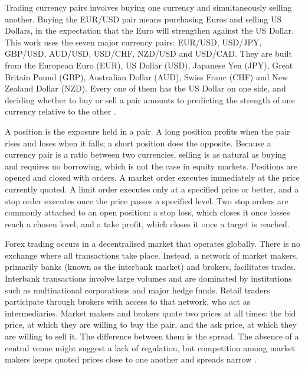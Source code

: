 Trading currency pairs involves buying one currency and simultaneously selling another. Buying the EUR/USD pair means purchasing Euros and selling US Dollars, in the expectation that the Euro will strengthen against the US Dollar. This work uses the seven major currency pairs: EUR/USD, USD/JPY, GBP/USD, AUD/USD, USD/CHF, NZD/USD and USD/CAD. They are built from the European Euro (EUR), US Dollar (USD), Japanese Yen (JPY), Great Britain Pound (GBP), Australian Dollar (AUD), Swiss Franc (CHF) and New Zealand Dollar (NZD). Every one of them has the US Dollar on one side, and deciding whether to buy or sell a pair amounts to predicting the strength of one currency relative to the other \cite{donnelly_art_2019}.

A position is the exposure held in a pair. A long position profits when the pair rises and loses when it falls; a short position does the opposite. Because a currency pair is a ratio between two currencies, selling is as natural as buying and requires no borrowing, which is not the case in equity markets. Positions are opened and closed with orders. A market order executes immediately at the price currently quoted. A limit order executes only at a specified price or better, and a stop order executes once the price passes a specified level. Two stop orders are commonly attached to an open position: a stop loss, which closes it once losses reach a chosen level, and a take profit, which closes it once a target is reached.

Forex trading occurs in a decentralised market that operates globally. There is no exchange where all transactions take place. Instead, a network of market makers, primarily banks (known as the interbank market) and brokers, facilitates trades. Interbank transactions involve large volumes and are dominated by institutions such as multinational corporations and major hedge funds. Retail traders participate through brokers with access to that network, who act as intermediaries. Market makers and brokers quote two prices at all times: the bid price, at which they are willing to buy the pair, and the ask price, at which they are willing to sell it. The difference between them is the spread. The absence of a central venue might suggest a lack of regulation, but competition among market makers keeps quoted prices close to one another and spreads narrow \cite{donnelly_art_2019}.


